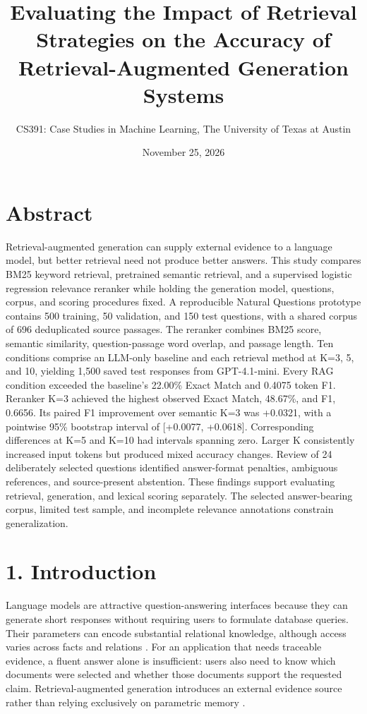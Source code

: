 \documentclass[
  11pt,
]{article}
\title{Evaluating the Impact of Retrieval Strategies on the Accuracy of
Retrieval-Augmented Generation Systems}
\subtitle{CS391: Case Studies in Machine Learning, The University of
Texas at Austin}
\author{}
\date{November 25, 2026}
\begin{document}
\maketitle

\hypertarget{abstract}{%
\section{Abstract}\label{abstract}}

Retrieval-augmented generation can supply external evidence to a
language model, but better retrieval need not produce better answers.
This study compares BM25 keyword retrieval, pretrained semantic
retrieval, and a supervised logistic regression relevance reranker while
holding the generation model, questions, corpus, and scoring procedures
fixed. A reproducible Natural Questions prototype contains 500 training,
50 validation, and 150 test questions, with a shared corpus of 696
deduplicated source passages. The reranker combines BM25 score, semantic
similarity, question-passage word overlap, and passage length. Ten
conditions comprise an LLM-only baseline and each retrieval method at
K=3, 5, and 10, yielding 1,500 saved test responses from GPT-4.1-mini.
Every RAG condition exceeded the baseline's 22.00\% Exact Match and
0.4075 token F1. Reranker K=3 achieved the highest observed Exact Match,
48.67\%, and F1, 0.6656. Its paired F1 improvement over semantic K=3 was
+0.0321, with a pointwise 95\% bootstrap interval of {[}+0.0077,
+0.0618{]}. Corresponding differences at K=5 and K=10 had intervals
spanning zero. Larger K consistently increased input tokens but produced
mixed accuracy changes. Review of 24 deliberately selected questions
identified answer-format penalties, ambiguous references, and
source-present abstention. These findings support evaluating retrieval,
generation, and lexical scoring separately. The selected answer-bearing
corpus, limited test sample, and incomplete relevance annotations
constrain generalization.

\hypertarget{introduction}{%
\section{1. Introduction}\label{introduction}}

Language models are attractive question-answering interfaces because
they can generate short responses without requiring users to formulate
database queries. Their parameters can encode substantial relational
knowledge, although access varies across facts and relations
\citep{lama}. For an application that needs traceable evidence, a fluent
answer alone is insufficient: users also need to know which documents
were selected and whether those documents support the requested claim.
Retrieval-augmented generation introduces an external evidence source
rather than relying exclusively on parametric memory \citep{rag}.
\end{document}

